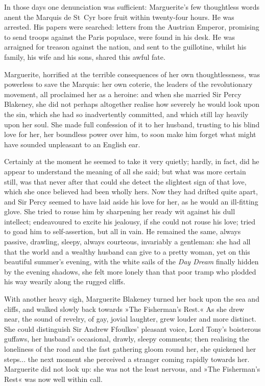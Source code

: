 In those days one denunciation was sufficient: Marguerite's few thoughtless words anent the Marquis de St~Cyr bore fruit within twenty-four hours. He was arrested. His papers were searched: letters from the Austrian Emperor, promising to send troops against the Paris populace, were found in his desk. He was arraigned for treason against the nation, and sent to the guillotine, whilst his family, his wife and his sons, shared this awful fate.

Marguerite, horrified at the terrible consequences of her own thoughtlessness, was powerless to save the Marquis: her own coterie, the leaders of the revolutionary movement, all proclaimed her as a heroine: and when she married Sir Percy Blakeney, she did not perhaps altogether realise how severely he would look upon the sin, which she had so inadvertently committed, and which still lay heavily upon her soul. She made full confession of it to her husband, trusting to his blind love for her, her boundless power over him, to soon make him forget what might have sounded unpleasant to an English ear.

Certainly at the moment he seemed to take it very quietly; hardly, in fact, did he appear to understand the meaning of all she said; but what was more certain still, was that never after that could she detect the slightest sign of that love, which she once believed had been wholly hers. Now they had drifted quite apart, and Sir Percy seemed to have laid aside his love for her, as he would an ill-fitting glove. She tried to rouse him by sharpening her ready wit against his dull intellect; endeavoured to excite his jealousy, if she could not rouse his love; tried to goad him to self-assertion, but all in vain. He remained the same, always passive, drawling, sleepy, always courteous, invariably a gentleman: she had all that the world and a wealthy husband can give to a pretty woman, yet on this beautiful summer's evening, with the white sails of the \textit{Day Dream} finally hidden by the evening shadows, she felt more lonely than that poor tramp who plodded his way wearily along the rugged cliffs.

With another heavy sigh, Marguerite Blakeney turned her back upon the sea and cliffs, and walked slowly back towards »The Fisherman's Rest.« As she drew near, the sound of revelry, of gay, jovial laughter, grew louder and more distinct. She could distinguish Sir Andrew Ffoulkes' pleasant voice, Lord Tony's boisterous guffaws, her husband's occasional, drawly, sleepy comments; then realising the loneliness of the road and the fast gathering gloom round her, she quickened her steps... the next moment she perceived a stranger coming rapidly towards her. Marguerite did not look up: she was not the least nervous, and »The Fisherman's Rest« was now well within call.

